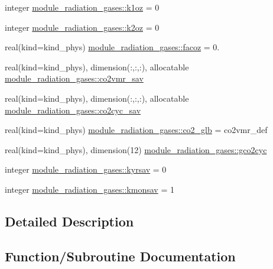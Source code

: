 \begin{DoxyCompactItemize}
\item 
integer \hyperlink{group__module__radiation__gases_ga0a14666484f230d3506a9b4740e2eeda}{module\+\_\+radiation\+\_\+gases\+::k1oz} = 0
\item 
integer \hyperlink{group__module__radiation__gases_ga0c3727c9e2a0bec46e84622c4591cd8b}{module\+\_\+radiation\+\_\+gases\+::k2oz} = 0
\item 
real(kind=kind\+\_\+phys) \hyperlink{group__module__radiation__gases_gac7c9fd8ece69872fdef473020ea03d6b}{module\+\_\+radiation\+\_\+gases\+::facoz} = 0.
\item 
real(kind=kind\+\_\+phys), dimension(\+:,\+:,\+:), allocatable \hyperlink{group__module__radiation__gases_ga4f35e5db780a64963dc65b8449def39d}{module\+\_\+radiation\+\_\+gases\+::co2vmr\+\_\+sav}
\item 
real(kind=kind\+\_\+phys), dimension(\+:,\+:,\+:), allocatable \hyperlink{group__module__radiation__gases_ga3985e306e5555089909fd42a4cc93afb}{module\+\_\+radiation\+\_\+gases\+::co2cyc\+\_\+sav}
\item 
real(kind=kind\+\_\+phys) \hyperlink{group__module__radiation__gases_ga0398d6837c9e8c41359e76a754147002}{module\+\_\+radiation\+\_\+gases\+::co2\+\_\+glb} = co2vmr\+\_\+def
\item 
real(kind=kind\+\_\+phys), dimension(12) \hyperlink{group__module__radiation__gases_gac2a03ad96c9aa598f9751fd689cb615f}{module\+\_\+radiation\+\_\+gases\+::gco2cyc}
\item 
integer \hyperlink{group__module__radiation__gases_ga6b4372e633bef3fb367e6ff3cf200bb8}{module\+\_\+radiation\+\_\+gases\+::kyrsav} = 0
\item 
integer \hyperlink{group__module__radiation__gases_gab1cf1b63398a3e7ec0334a7c97258b4d}{module\+\_\+radiation\+\_\+gases\+::kmonsav} = 1
\end{DoxyCompactItemize}


\subsection{Detailed Description}


\subsection{Function/\+Subroutine Documentation}
